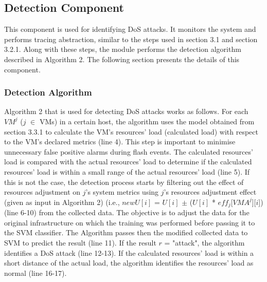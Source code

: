 \documentclass[twocolumn]{bmcart}%
\begin{document}
\subsection*{Detection Component}

This component is used for identifying DoS attacks. It monitors the system and performs tracing abstraction, similar to the steps used in section 3.1 and section 3.2.1. Along with these steps, the module performs the detection algorithm described in Algorithm 2. The following section presents the details of this component.

\subsubsection*{Detection Algorithm}

Algorithm 2 that is used for detecting DoS attacks works as follows. For each $VM^{j}$ ($j$ $\in$ VMs) in a certain host, the algorithm uses the model obtained from section 3.3.1 to calculate the VM's resources' load (calculated load) with respect to the VM's declared metrics (line 4). This step is important to minimise unnecessary false positive alarms during flash events. The calculated resources' load is compared with the actual resources' load to determine if the calculated resources' load is within a small range of the actual resources' load (line 5). If this is not the case, the detection process starts by filtering out the effect of resources adjustment on $j$'s system metrics using $j$'s resources adjustment effect (given as input in Algorithm 2) (i.e.,  $newU[i]$ = $U[i]$ $\pm$ ($U[i]$ * $eff_{j}$[$VMA^{j}$][$i$]) (line 6-10) from the collected data. The objective is to adjust the data for the original infrastructure on which the training was performed before passing it to the SVM classifier. The Algorithm passes then the modified collected data to SVM to predict the result (line 11). If the result $r$ = "attack", the algorithm identifies a DoS attack (line 12-13). If the calculated resources' load is within a short distance of the actual load, the algorithm identifies the resources' load as normal (line 16-17).
\end{document}
